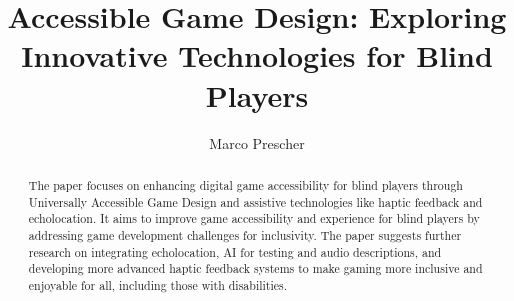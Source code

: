 \documentclass[sigconf,natbib=false,10pt]{acmart}
\begin{document}
	
	\title{Accessible Game Design: Exploring Innovative Technologies for Blind Players}
	
	\author{Marco Prescher}
	
	\renewcommand{\shortauthors}{Marco Prescher}
	
	\begin{abstract}
		The paper focuses on enhancing digital game accessibility for blind players through Universally Accessible Game Design and assistive technologies like haptic feedback and echolocation.
		It aims to improve game accessibility and experience for blind players by addressing game development challenges for inclusivity.
		The paper suggests further research on integrating echolocation, AI for testing and audio descriptions, and developing more advanced haptic feedback systems to make gaming more inclusive and enjoyable for all, including those with disabilities.
	\end{abstract}
	
	
	
	
	\maketitle
	
\end{document}
